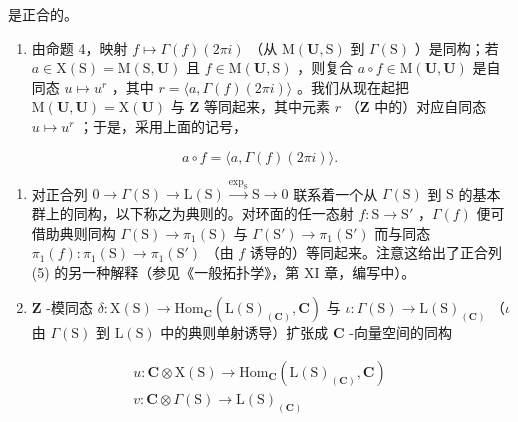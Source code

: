 是正合的。

\begin{enumerate}
\def\labelenumi{\arabic{enumi})}
\setcounter{enumi}{1}
\tightlist
\item
  由命题 4，映射 \(f \mapsto \Gamma(f)(2\pi i)\) （从 \(\mathrm{M}(\mathbf{U},\mathrm{S})\) 到 \(\Gamma(\mathrm{S})\) ）是同构；若 \(a \in \mathrm{X}(\mathrm{S}) = \mathrm{M}(\mathrm{S},\mathbf{U})\) 且 \(f \in \mathrm{M}(\mathbf{U},\mathrm{S})\) ，则复合 \(a \circ f \in \mathrm{M}(\mathbf{U},\mathbf{U})\) 是自同态 \(u \mapsto u^r\) ，其中 \(r = \langle a,\Gamma(f)(2\pi i)\rangle\) 。我们从现在起把 \(\mathrm{M}(\mathbf{U},\mathbf{U}) = \mathrm{X}(\mathbf{U})\) 与 \(\mathbf{Z}\) 等同起来，其中元素 \(r\) （\(\mathbf{Z}\) 中的）对应自同态 \(u \mapsto u^r\) ；于是，采用上面的记号，
\end{enumerate}

\[
a \circ f = \langle a, \Gamma (f) (2 \pi i) \rangle .
\]

\begin{enumerate}
\def\labelenumi{\arabic{enumi})}
\setcounter{enumi}{2}
\item
  对正合列 \(0 \to \Gamma(\mathrm{S}) \to \mathrm{L}(\mathrm{S}) \xrightarrow{\exp_{\mathrm{S}}} \mathrm{S} \to 0\) 联系着一个从 \(\Gamma(\mathrm{S})\) 到 \(\mathrm{S}\) 的基本群上的同构，以下称之为典则的。对环面的任一态射 \(f: \mathrm{S} \to \mathrm{S}'\) ，\(\Gamma(f)\) 便可借助典则同构 \(\Gamma(\mathrm{S}) \to \pi_1(\mathrm{S})\) 与 \(\Gamma(\mathrm{S}') \to \pi_1(\mathrm{S}')\) 而与同态 \(\pi_1(f): \pi_1(\mathrm{S}) \to \pi_1(\mathrm{S}')\) （由 \(f\) 诱导的）等同起来。注意这给出了正合列 (5) 的另一种解释（参见《一般拓扑学》，第 XI 章，编写中）。
\item
  \(\mathbf{Z}\) -模同态 \(\delta : \mathrm{X}(\mathrm{S}) \to \mathrm{Hom}_{\mathbf{C}}(\mathrm{L}(\mathrm{S})_{(\mathbf{C})}, \mathbf{C})\) 与 \(\iota : \Gamma(\mathrm{S}) \to \mathrm{L}(\mathrm{S})_{(\mathbf{C})}\) （\(\iota\) 由 \(\Gamma(\mathrm{S})\) 到 \(\mathrm{L}(\mathrm{S})\) 中的典则单射诱导）扩张成 \(\mathbf{C}\) -向量空间的同构
\end{enumerate}

\[
\begin{array}{l} u: \mathbf {C} \otimes \mathrm{X} (\mathrm{S}) \to \mathrm{Hom} _ {\mathbf {C}} (\mathrm{L} (\mathrm{S}) _ {(\mathbf {C})}, \mathbf {C}) \\ v: \mathbf {C} \otimes \Gamma (\mathrm{S}) \to \mathrm{L} (\mathrm{S}) _ {(\mathbf {C})} \end{array}
\]

